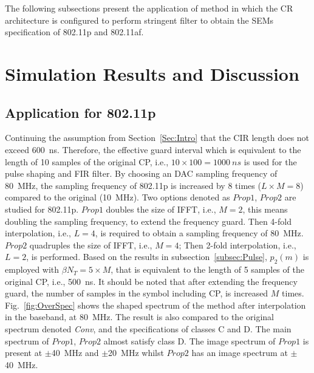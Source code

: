 The following subsections present the application of method in which the CR architecture is configured to perform stringent filter to obtain the SEMs specification of 802.11p and 802.11af. 
\section{Simulation Results and Discussion}
\subsection{Application for 802.11p}
Continuing the assumption from Section~\ref{Sec:Intro} that the CIR length does not exceed 600~ns.
Therefore, the effective guard interval which is equivalent to the length of 10 samples of the original CP, i.e., $10 \times 100=1000~ns$ is used for the pulse shaping and FIR filter.
By choosing an DAC sampling frequency of 80~MHz, the sampling frequency of 802.11p is increased by 8 times ($L\times M =8$) compared to the original (10~MHz).
Two options denoted as $\mathit{Prop}1$, $\mathit{Prop}2$ are studied for 802.11p.
$\mathit{Prop}1$ doubles the size of IFFT, i.e., $M=2$, this means doubling the sampling frequency, to extend the frequency guard.
Then 4-fold interpolation, i.e., $L=4$, is required to obtain a sampling frequency of 80~MHz.
$\mathit{Prop}2$ quadruples the size of IFFT, i.e., $M=4$; Then 2-fold interpolation, i.e., $L=2$, is performed.
Based on the results in subsection~\ref{subsec:Pulse}, $p_2(m)$ is employed with $\beta N_{T}=5 \times M$, that is equivalent to the length of 5 samples of the original CP, i.e., 500~ns.
It should be noted that after extending the frequency guard, the number of samples in the symbol including CP, is increased $M$ times.
Fig.~\ref{fig:OverSpec} shows the shaped spectrum of the method after interpolation in the baseband, at 80~MHz.
The result is also compared to the original spectrum denoted \emph{Conv}, and the specifications of classes C and D.
The main spectrum of $\mathit{Prop}1$, $\mathit{Prop}2$ almost satisfy class D.
The image spectrum of $\mathit{Prop}1$ is present at $\pm$40~MHz and $\pm$20~MHz whilst $\mathit{Prop}2$ has an image spectrum at $\pm$40~MHz.

